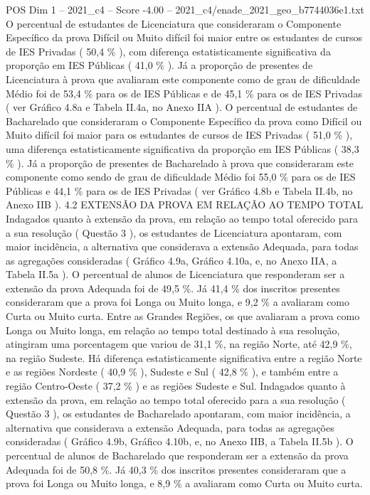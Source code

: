 \begin{textsample}{POS Dim 1 – 2021\_c4 – Score -4.00 – 2021\_c4/enade\_2021\_geo\_b7744036e1.txt}
O percentual de estudantes de Licenciatura que consideraram o Componente Específico da prova Difícil ou Muito difícil foi maior entre os estudantes de cursos de IES Privadas ( 50,4 \% ), com diferença estatisticamente significativa da proporção em IES Públicas ( 41,0 \% ).
Já a proporção de presentes de Licenciatura à prova que avaliaram este componente como de grau de dificuldade Médio foi de 53,4 \% para os de IES Públicas e de 45,1 \% para os de IES Privadas ( ver Gráfico 4.8a e Tabela II.4a, no Anexo IIA ).
O percentual de estudantes de Bacharelado que consideraram o Componente Específico da prova como Difícil ou Muito difícil foi maior para os estudantes de cursos de IES Privadas ( 51,0 \% ), uma diferença estatisticamente significativa da proporção em IES Públicas ( 38,3 \% ).
Já a proporção de presentes de Bacharelado à prova que consideraram este componente como sendo de grau de dificuldade Médio foi 55,0 \% para os de IES Públicas e 44,1 \% para os de IES Privadas ( ver Gráfico 4.8b e Tabela II.4b, no Anexo IIB ). 4.2 EXTENSÃO DA PROVA EM RELAÇÃO AO TEMPO TOTAL Indagados quanto à extensão da prova, em relação ao tempo total oferecido para a sua resolução ( Questão 3 ), os estudantes de Licenciatura apontaram, com maior incidência, a alternativa que considerava a extensão Adequada, para todas as agregações consideradas ( Gráfico 4.9a, Gráfico 4.10a, e, no Anexo IIA, a Tabela II.5a ).
O percentual de alunos de Licenciatura que responderam ser a extensão da prova Adequada foi de 49,5 \%.
Já 41,4 \% dos inscritos presentes consideraram que a prova foi Longa ou Muito longa, e 9,2 \% a avaliaram como Curta ou Muito curta.
Entre as Grandes Regiões, os que avaliaram a prova como Longa ou Muito longa, em relação ao tempo total destinado à sua resolução, atingiram uma porcentagem que variou de 31,1 \%, na região Norte, até 42,9 \%, na região Sudeste.
Há diferença estatisticamente significativa entre a região Norte e as regiões Nordeste ( 40,9 \% ), Sudeste e Sul ( 42,8 \% ), e também entre a região Centro-Oeste ( 37,2 \% ) e as regiões Sudeste e Sul.
Indagados quanto à extensão da prova, em relação ao tempo total oferecido para a sua resolução ( Questão 3 ), os estudantes de Bacharelado apontaram, com maior incidência, a alternativa que considerava a extensão Adequada, para todas as agregações consideradas ( Gráfico 4.9b, Gráfico 4.10b, e, no Anexo IIB, a Tabela II.5b ).
O percentual de alunos de Bacharelado que responderam ser a extensão da prova Adequada foi de 50,8 \%.
Já 40,3 \% dos inscritos presentes consideraram que a prova foi Longa ou Muito longa, e 8,9 \% a avaliaram como Curta ou Muito curta.

\end{textsample}
